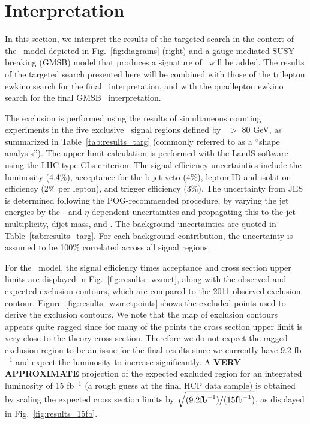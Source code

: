 \section{Interpretation}
\label{sec:interpretation}

In this section, we interpret the results of the targeted search in the context of the \wzmet\ model depicted in Fig.~\ref{fig:diagrams} (right)
and a gauge-mediated SUSY breaking (GMSB) model that produces a signature of \zzmet\ will be added. The results of the targeted search presented here
will be combined with those of the trilepton ewkino search for the final \wzmet\ interpretation, and with the quadlepton ewkino search
for the final GMSB \zzmet\ interpretation.

The exclusion is performed using the results of simultaneous counting experiments in the five exclusive \MET\ signal regions defined by \MET\ $>$ 80 GeV,
as summarized in Table~\ref{tab:results_targ} (commonly referred to as a ``shape analysis''). 
The upper limit calculation is performed with the LandS software using the LHC-type CLs criterion.
The signal efficiency uncertainties include the luminosity (4.4\%), acceptance for the b-jet veto (4\%), lepton ID and isolation efficiency (2\% per lepton),
and trigger efficiency (3\%). The uncertainty from JES is determined following the POG-recommended procedure, by varying the jet energies by the 
\pt- and $\eta$-dependent uncertainties and propagating this to the jet multiplicity, dijet mass, and \MET.
The background uncertainties are quoted in Table~\ref{tab:results_targ}. For each background contribution, the uncertainty is assumed to be 100\% 
correlated across all signal regions.

For the \wzmet\ model, the signal efficiency times acceptance and cross section upper limits are displayed in Fig.~\ref{fig:results_wzmet},
along with the observed and expected exclusion contours, which are compared to the 2011 observed exclusion contour.
Figure~\ref{fig:results_wzmetpoints} shows the excluded points used to derive the exclusion contours. We note that the map of exclusion
contours appears quite ragged since for many of the points the cross section upper limit is very close to the theory cross section.
Therefore we do not expect the ragged exclusion region to be an issue for the final results since
we currently have 9.2 fb$^{-1}$ and expect the luminosity to increase significantly. A {\bf VERY APPROXIMATE} projection of the expected excluded region
for an integrated luminosity of 15 fb$^{-1}$ (a rough guess at the final HCP data sample) is obtained by scaling the expected cross section limits by 
$\sqrt{(9.2 \rm{fb}^{-1})/(15 \rm{fb}^{-1})}$, as displayed in Fig.~\ref{fig:results_15fb}.

